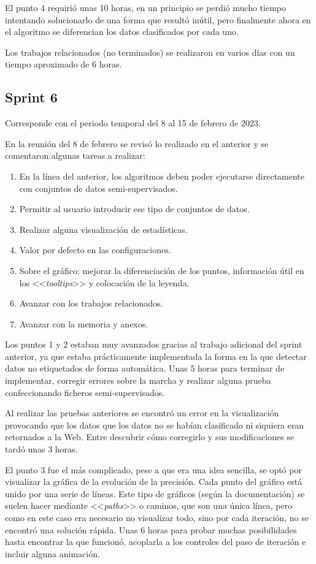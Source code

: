 El punto 4 requirió unas 10 horas, en un principio se perdió mucho tiempo
intentando solucionarlo de una forma que resultó inútil, pero finalmente ahora
en el algoritmo se diferencian los datos clasificados por cada uno.

Los trabajos relacionados (no terminados) se realizaron en varios días con un
tiempo aproximado de 6 horas.

\subsection{Sprint 6}
Corresponde con el periodo temporal del 8 al 15 de febrero de 2023.

En la reunión del 8 de febrero se revisó lo realizado en el anterior y se
comentaron algunas tareas a realizar:
\begin{enumerate}
    \item En la línea del anterior, los algoritmos deben poder ejecutarse
    directamente con conjuntos de datos semi-supervisados.
    \item Permitir al usuario introducir ese tipo de conjuntos de datos.
    \item Realizar alguna visualización de estadísticas.
    \item Valor por defecto en las configuraciones.
    \item Sobre el gráfico: mejorar la diferenciación de los puntos, información
    útil en los <<\textit{tooltips}>> y colocación de la leyenda.
    \item Avanzar con los trabajos relacionados.
    \item Avanzar con la memoria y anexos.
\end{enumerate}

Los puntos 1 y 2 estaban muy avanzados gracias al trabajo adicional del sprint
anterior, ya que estaba prácticamente implementada la forma en la que detectar
datos no etiquetados de forma automática. Unas 5 horas para terminar de
implementar, corregir errores sobre la marcha y realizar alguna prueba
confeccionando ficheros semi-supervisados.

Al realizar las pruebas anteriores se encontró un error en la visualización
provocando que los datos que los datos no se habían clasificado ni siquiera eran
retornados a la Web. Entre descubrir cómo corregirlo y sus modificaciones se
tardó unas 3 horas.

El punto 3 fue el más complicado, pese a que era una idea sencilla, se optó por
visualizar la gráfica de la evolución de la precisión. Cada punto del gráfico
está unido por una serie de líneas. Este tipo de gráficos (según la
documentación) se suelen hacer mediante <<\textit{paths}>> o caminos, que son
una única línea, pero como en este caso era necesario no visualizar todo, sino
por cada iteración, no se encontró una solución rápida. Unas 6 horas para probar
muchas posibilidades hasta encontrar la que funcionó, acoplarla a los controles
del paso de iteración e incluir alguna animación.

